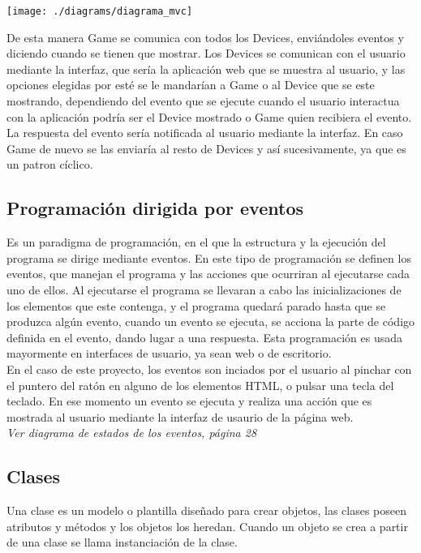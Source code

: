\documentclass[a4paper,10pt]{article}
\begin{document}
\begin{center}
 \texttt{[image: ./diagrams/diagrama\_mvc]}
\end{center}

De esta manera Game se comunica con todos los Devices, enviándoles eventos y diciendo cuando se tienen que mostrar. 
Los Devices se comunican con el usuario mediante la interfaz, que sería la aplicación web que se muestra al usuario, y las opciones elegidas por
esté se le mandarían a Game o al Device que se este mostrando, dependiendo del evento que se ejecute cuando el usuario interactua
con la aplicación podría ser el Device mostrado o Game quien recibiera el evento. La respuesta del evento sería notificada al usuario mediante la interfaz.
En caso Game de nuevo se las enviaría al resto de Devices y así sucesivamente, ya que es un patron cíclico.
\cleardoublepage

\subsection{Programación dirigida por eventos}

Es un paradigma de programación, en el que la estructura y la ejecución del 
programa se dirige mediante eventos.
En este tipo de programación se definen los eventos, que manejan el programa y las acciones 
que ocurriran al ejecutarse cada uno de ellos. Al ejecutarse el programa se llevaran a cabo las inicializaciones 
de los elementos que este contenga, y el programa quedará parado hasta que se produzca algún evento,
cuando un evento se ejecuta, se acciona la parte de código definida en el evento, dando lugar
a una respuesta. Esta programación es usada mayormente en interfaces de usuario, ya sean web o de 
escritorio.\\

En el caso de este proyecto, los eventos son inciados por el usuario al pinchar con el
puntero del ratón en alguno de los elementos HTML, o pulsar una tecla del teclado.
En ese momento un evento se ejecuta y realiza una acción que es mostrada al usuario mediante
la interfaz de usaurio de la página web.\\

\emph{Ver diagrama de estados de los eventos, página 28}

\subsection{Clases}

Una clase es un modelo o plantilla diseñado para crear objetos, las clases poseen atributos y
métodos y los objetos los heredan. Cuando un objeto se crea a partir de una clase se llama
instanciación de la clase.\\
\end{document}

